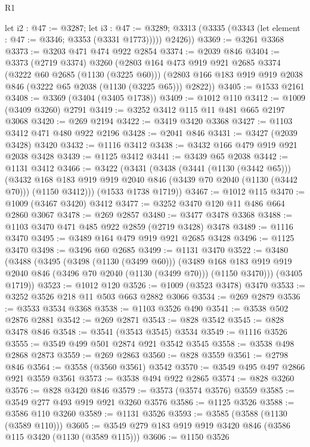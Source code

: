 \begin{lexlean}{R1}
\begin{coremodule}
        let i2 : @47 := @3287;
        let i3 : @47 := @3289;
        @3313 (@3335 (@3343 (let element : @47 := @3346; @3353 (@3331 @1773)))))
        @2426))
@3369 := @3261 @3368
@3373 := @3203 @471 @474 @922 @2854
@3374 := @2039 @846
@3404 := @3373
    (@2719 @3374)
    @3260
    (@2803
      @164
      @473
      @919
      @921
      @2685
      @3374
      (@3222 @60 @2685 (@1130 (@3225 @60)))
      (@2803 @166 @183 @919 @919 @2038 @846 (@3222 @65 @2038 (@1130 (@3225 @65))) @2822))
@3405 := @1533 @2161
@3408 := @3369 (@3404 (@3405 @1738))
@3409 := @1012 @110
@3412 := @1009 (@3409 @3260) @2791
@3419 := @3252 @3412 @115 @11 @481 @665 @2197 @3068
@3420 := @269 @2194
@3422 := @3419 @3420 @3368
@3427 := @1103 @3412 @471 @480 @922 @2196
@3428 := @2041 @846
@3431 := @3427 (@2039 @3428) @3420
@3432 := @1116 @3412
@3438 := @3432 @166 @479 @919 @921 @2038 @3428
@3439 := @1125 @3412
@3441 := @3439 @65 @2038
@3442 := @1131 @3412
@3466 := @3422
    (@3431
      (@3438
        (@3441 (@1130 (@3442 @65)))
        (@3432 @168 @183 @919 @919 @2040 @846 (@3439 @70 @2040 (@1130 (@3442 @70))) (@1150 @3412)))
      (@1533 @1738 @1719))
@3467 := @1012 @115
@3470 := @1009 (@3467 @3420) @3412
@3477 := @3252 @3470 @120 @11 @486 @664 @2860 @3067
@3478 := @269 @2857
@3480 := @3477 @3478 @3368
@3488 := @1103 @3470 @471 @485 @922 @2859 (@2719 @3428) @3478
@3489 := @1116 @3470
@3495 := @3489 @164 @479 @919 @921 @2685 @3428
@3496 := @1125 @3470
@3498 := @3496 @60 @2685
@3499 := @1131 @3470
@3522 := @3480
    (@3488
      (@3495
        (@3498 (@1130 (@3499 @60)))
        (@3489 @168 @183 @919 @919 @2040 @846 (@3496 @70 @2040 (@1130 (@3499 @70))) (@1150 @3470)))
      (@3405 @1719))
@3523 := @1012 @120
@3526 := @1009 (@3523 @3478) @3470
@3533 := @3252 @3526 @218 @11 @503 @663 @2882 @3066
@3534 := @269 @2879
@3536 := @3533 @3534 @3368
@3538 := @1103 @3526 @490
@3541 := @3538 @502 @2876 @2881
@3542 := @269 @2871
@3543 := @828 @3542
@3545 := @828 @3478 @846
@3548 := @3541 (@3543 @3545) @3534
@3549 := @1116 @3526
@3555 := @3549 @499 @501 @2874 @921 @3542 @3545
@3558 := @3538 @498 @2868 @2873
@3559 := @269 @2863
@3560 := @828 @3559
@3561 := @2798 @846
@3564 := @3558 (@3560 @3561) @3542
@3570 := @3549 @495 @497 @2866 @921 @3559 @3561
@3573 := @3538 @494 @922 @2865
@3574 := @828 @3260
@3576 := @828 @3420 @846
@3579 := @3573 (@3574 @3576) @3559
@3585 := @3549 @277 @493 @919 @921 @3260 @3576
@3586 := @1125 @3526
@3588 := @3586 @110 @3260
@3589 := @1131 @3526
@3593 := @3585 (@3588 (@1130 (@3589 @110)))
@3605 := @3549 @279 @183 @919 @919 @3420 @846 (@3586 @115 @3420 (@1130 (@3589 @115)))
@3606 := @1150 @3526

\end{coremodule}
\end{lexlean}
